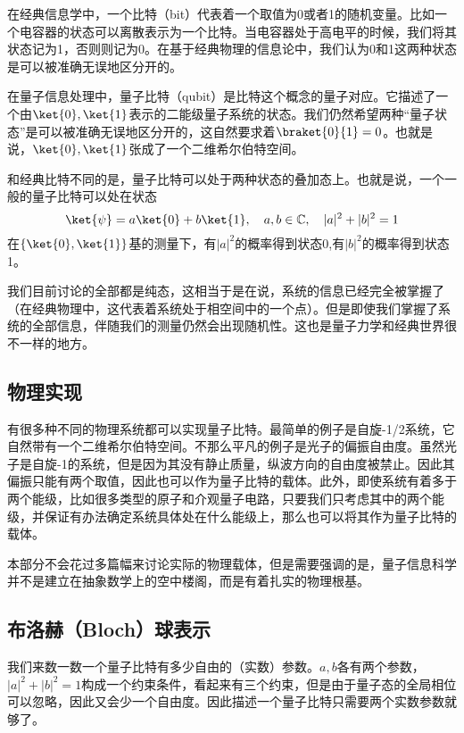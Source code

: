 

在经典信息学中，一个比特（bit）代表着一个取值为0或者1的随机变量。比如一个电容器的状态可以离散表示为一个比特。当电容器处于高电平的时候，我们将其状态记为1，否则则记为0。在基于经典物理的信息论中，我们认为0和1这两种状态是可以被准确无误地区分开的。

在量子信息处理中，量子比特（qubit）是比特这个概念的量子对应。它描述了一个由$\ket{0},\ket{1}$表示的二能级量子系统的状态。我们仍然希望两种“量子状态”是可以被准确无误地区分开的，这自然要求着$\braket{0}{1}=0$。也就是说，$\ket{0},\ket{1}$张成了一个二维希尔伯特空间。

和经典比特不同的是，量子比特可以处于两种状态的叠加态上。也就是说，一个一般的量子比特可以处在状态
\begin{equation}
\ket{\psi}=a\ket{0}+b\ket{1},\quad a,b\in\mathbb{C},\quad |a|^2+|b|^2=1
\end{equation}
在$\{\ket{0},\ket{1}\}$基的测量下，有$|a|^2$的概率得到状态0,有$|b|^2$的概率得到状态1。

我们目前讨论的全部都是纯态，这相当于是在说，系统的信息已经完全被掌握了（在经典物理中，这代表着系统处于相空间中的一个点）。但是即使我们掌握了系统的全部信息，伴随我们的测量仍然会出现随机性。这也是量子力学和经典世界很不一样的地方。



\subsection{物理实现}

有很多种不同的物理系统都可以实现量子比特。最简单的例子是自旋-1/2系统，它自然带有一个二维希尔伯特空间。不那么平凡的例子是光子的偏振自由度。虽然光子是自旋-1的系统，但是因为其没有静止质量，纵波方向的自由度被禁止。因此其偏振只能有两个取值，因此也可以作为量子比特的载体。此外，即使系统有着多于两个能级，比如很多类型的原子和介观量子电路，只要我们只考虑其中的两个能级，并保证有办法确定系统具体处在什么能级上，那么也可以将其作为量子比特的载体。

本部分不会花过多篇幅来讨论实际的物理载体，但是需要强调的是，量子信息科学并不是建立在抽象数学上的空中楼阁，而是有着扎实的物理根基。

\subsection{布洛赫（Bloch）球表示}

我们来数一数一个量子比特有多少自由的（实数）参数。$a,b$各有两个参数，$|a|^2+|b|^2=1$构成一个约束条件，看起来有三个约束，但是由于量子态的全局相位可以忽略，因此又会少一个自由度。因此描述一个量子比特只需要两个实数参数就够了。

